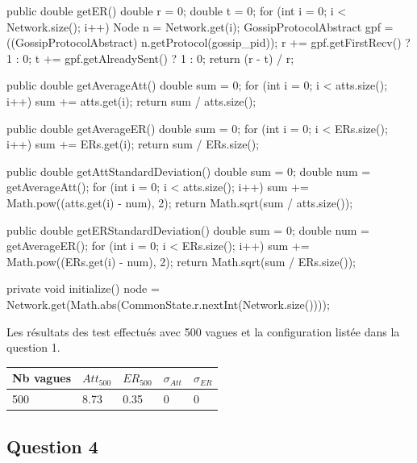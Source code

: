 \documentclass[10pt]{report}
\begin{document}
\begin{boxedlisting}
{	public double getER() {
		double r = 0;
		double t = 0;
		for (int i = 0; i < Network.size(); i++) {
			Node n = Network.get(i);
			GossipProtocolAbstract gpf = ((GossipProtocolAbstract) n.getProtocol(gossip_pid));
			r += gpf.getFirstRecv() ? 1 : 0;
			t += gpf.getAlreadySent() ? 1 : 0;
		}
		return (r - t) / r;
	}
	
	public double getAverageAtt() {
		double sum = 0;
		for (int i = 0; i < atts.size(); i++) {sum += atts.get(i);}
		return sum / atts.size();
	}

	public double getAverageER() {
		double sum = 0;
		for (int i = 0; i < ERs.size(); i++) {sum += ERs.get(i);}
		return sum / ERs.size();
	}

	public double getAttStandardDeviation() {
		double sum = 0;
		double num = getAverageAtt();
		for (int i = 0; i < atts.size(); i++) {sum += Math.pow((atts.get(i) - num), 2);}
		return Math.sqrt(sum / atts.size());
	}

	public double getERStandardDeviation() {
		double sum = 0;
		double num = getAverageER();
		for (int i = 0; i < ERs.size(); i++) {sum += Math.pow((ERs.get(i) - num), 2);}
		return Math.sqrt(sum / ERs.size());
	}

	private void initialize() {
		node = Network.get(Math.abs(CommonState.r.nextInt(Network.size())));
	}
}
\end{boxedlisting}


Les résultats des test effectués avec 500 vagues et la configuration listée dans la question 1.\\

\begin{center}
\begin{tabular}{|l|l|l|l|l|}\hline
	Nb vagues & $Att_{500}$ & $ER_{500}$ & $\sigma_{Att}$ & $\sigma_{ER}$\\ \hline
	500 & 8.73 & 0.35 & 0 & 0 \\ \hline 
\end{tabular}
\end{center}

\subsection{Question 4}
\end{document}
